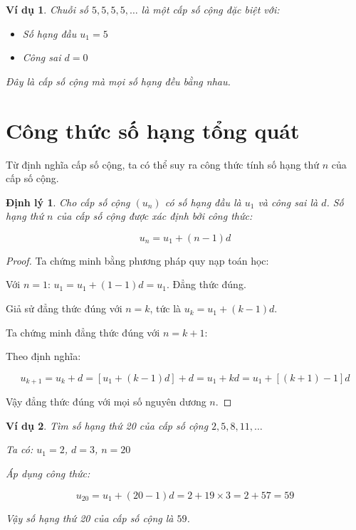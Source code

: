 \documentclass[12pt,a4paper]{report}
\newtheorem{theorem}{Định lý}[section]
\newtheorem{example}{Ví dụ}[section]
\begin{document}
\begin{example}
    Chuỗi số $5, 5, 5, 5, \dots$ là một cấp số cộng đặc biệt với:
    
    \begin{itemize}[label=\textbullet]
        \item Số hạng đầu $u_1 = 5$
        \item Công sai $d = 0$
    \end{itemize}
    
    Đây là cấp số cộng mà mọi số hạng đều bằng nhau.
\end{example}

\section{Công thức số hạng tổng quát}

Từ định nghĩa cấp số cộng, ta có thể suy ra công thức tính số hạng thứ $n$ của cấp số cộng.

\begin{theorem}
    Cho cấp số cộng $(u_n)$ có số hạng đầu là $u_1$ và công sai là $d$. Số hạng thứ $n$ của cấp số cộng được xác định bởi công thức:
    
    \[
        u_n = u_1 + (n - 1)d
    \]
\end{theorem}

\begin{proof}
    Ta chứng minh bằng phương pháp quy nạp toán học:
    
    Với $n = 1$: $u_1 = u_1 + (1 - 1)d = u_1$. Đẳng thức đúng.
    
    Giả sử đẳng thức đúng với $n = k$, tức là $u_k = u_1 + (k - 1)d$.
    
    Ta chứng minh đẳng thức đúng với $n = k + 1$:
    
    Theo định nghĩa:
    
    \[
        u_{k+1} = u_k + d = [u_1 + (k - 1)d] + d
        = u_1 + kd = u_1 + [(k + 1) - 1]d
    \]
    
    Vậy đẳng thức đúng với mọi số nguyên dương $n$.
\end{proof}

\begin{example}
    Tìm số hạng thứ 20 của cấp số cộng $2, 5, 8, 11, \dots$
    
    Ta có: $u_1 = 2$, $d = 3$, $n = 20$
    
    Áp dụng công thức:
    
    \[
        u_{20} = u_1 + (20 - 1)d
        = 2 + 19 \times 3
        = 2 + 57 = 59
    \]
    
    Vậy số hạng thứ 20 của cấp số cộng là $59$.
\end{example}
\end{document}

